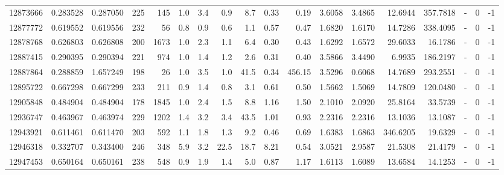 \begin{tabular}{rrrrrrrrrrrrrrrlrr}
  12873666 & 0.283528 &   0.287050 &  225 &  145 &      1.0 &      3.4 &     0.9 &      8.7 &       0.33 &        0.19 &  3.6058 &  3.4865 &   12.6944 &  357.7818 &             - &        0 &         -1 \\
  12877772 & 0.619552 &   0.619556 &  232 &   56 &      0.8 &      0.9 &     0.6 &      1.1 &       0.57 &        0.47 &  1.6820 &  1.6170 &   14.7286 &  338.4095 &             - &        0 &         -1 \\
  12878768 & 0.626803 &   0.626808 &  200 & 1673 &      1.0 &      2.3 &     1.1 &      6.4 &       0.30 &        0.43 &  1.6292 &  1.6572 &   29.6033 &   16.1786 &             - &        0 &         -1 \\
  12887415 & 0.290395 &   0.290394 &  221 &  974 &      1.0 &      1.4 &     1.2 &      2.6 &       0.31 &        0.40 &  3.5866 &  3.4490 &    6.9935 &  186.2197 &             - &        0 &         -1 \\
  12887864 & 0.288859 &   1.657249 &  198 &   26 &      1.0 &      3.5 &     1.0 &     41.5 &       0.34 &      456.15 &  3.5296 &  0.6068 &   14.7689 &  293.2551 &             - &        0 &         -1 \\
  12895722 & 0.667298 &   0.667299 &  233 &  211 &      0.9 &      1.4 &     0.8 &      3.1 &       0.61 &        0.50 &  1.5662 &  1.5069 &   14.7809 &  120.0480 &             - &        0 &         -1 \\
  12905848 & 0.484904 &   0.484904 &  178 & 1845 &      1.0 &      2.4 &     1.5 &      8.8 &       1.16 &        1.50 &  2.1010 &  2.0920 &   25.8164 &   33.5739 &             - &        0 &         -1 \\
  12936747 & 0.463967 &   0.463974 &  229 & 1202 &      1.4 &      3.2 &     3.4 &     43.5 &       1.01 &        0.93 &  2.2316 &  2.2316 &   13.1036 &   13.1087 &             - &        0 &         -1 \\
  12943921 & 0.611461 &   0.611470 &  203 &  592 &      1.1 &      1.8 &     1.3 &      9.2 &       0.46 &        0.69 &  1.6383 &  1.6863 &  346.6205 &   19.6329 &             - &        0 &         -1 \\
  12946318 & 0.332707 &   0.343400 &  246 &  348 &      5.9 &      3.2 &    22.5 &     18.7 &       8.21 &        0.54 &  3.0521 &  2.9587 &   21.5308 &   21.4179 &             - &        0 &         -1 \\
  12947453 & 0.650164 &   0.650161 &  238 &  548 &      0.9 &      1.9 &     1.4 &      5.0 &       0.87 &        1.17 &  1.6113 &  1.6089 &   13.6584 &   14.1253 &             - &        0 &         -1 \\

\end{tabular}
